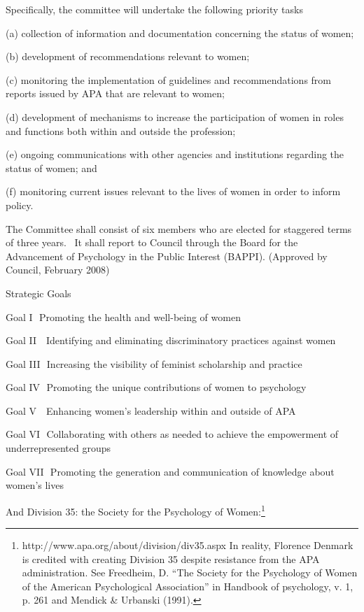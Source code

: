 Specifically, the committee will undertake the following priority tasks

(a) collection of information and documentation concerning the status of women;

(b) development of recommendations relevant to women;

(c) monitoring the implementation of guidelines and recommendations from reports issued by APA that are relevant to women;

(d) development of mechanisms to increase the participation of women in roles and functions both within and outside the profession;

(e) ongoing communications with other agencies and institutions regarding the status of women; and

(f) monitoring current issues relevant to the lives of women in order to inform policy.

The Committee shall consist of six members who are elected for staggered terms of three years.  It shall report to Council through the Board for the Advancement of Psychology in the Public Interest (BAPPI). (Approved by Council, February 2008)

Strategic Goals

Goal I
 Promoting the health and well-being of women

Goal II  
Identifying and eliminating discriminatory practices against women

Goal III 
Increasing the visibility of feminist scholarship and practice

Goal IV 
Promoting the unique contributions of women to psychology

Goal V  
Enhancing women's leadership within and outside of APA

Goal VI 
Collaborating with others as needed to achieve the empowerment of underrepresented groups

Goal VII 
Promoting the generation and communication of knowledge about women's lives

And Division 35: the Society for the Psychology of Women:\footnote{http:\slash \slash www.apa.org\slash about\slash division\slash div35.aspx In reality, Florence Denmark is credited with creating Division 35 despite resistance from the APA administration. See Freedheim, D. ``The Society for the Psychology of Women of the American Psychological Association'' in Handbook of psychology, v. 1, p. 261 and Mendick \& Urbanski (1991).}

